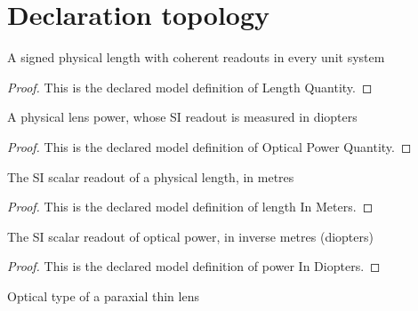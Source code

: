 \section{Declaration topology}
\begin{definition}
  \label{def:physics:phyx-mini-0130:phyxminiproblems-problemphyxmini0130-lengthquantity}
  A signed physical length with coherent readouts in every unit system
\end{definition}
\begin{proof}
  This is the declared model definition of Length Quantity.
\end{proof}
\begin{definition}
  \label{def:physics:phyx-mini-0130:phyxminiproblems-problemphyxmini0130-opticalpowerquantity}
  A physical lens power, whose SI readout is measured in diopters
\end{definition}
\begin{proof}
  This is the declared model definition of Optical Power Quantity.
\end{proof}
\begin{definition}
  \label{def:physics:phyx-mini-0130:phyxminiproblems-problemphyxmini0130-lengthinmeters}
  The SI scalar readout of a physical length, in metres
\end{definition}
\begin{proof}
  This is the declared model definition of length In Meters.
\end{proof}
\begin{definition}
  \label{def:physics:phyx-mini-0130:phyxminiproblems-problemphyxmini0130-powerindiopters}
  The SI scalar readout of optical power, in inverse metres (diopters)
\end{definition}
\begin{proof}
  This is the declared model definition of power In Diopters.
\end{proof}
\begin{definition}
  \label{def:physics:phyx-mini-0130:phyxminiproblems-problemphyxmini0130-thinlenskind}
  Optical type of a paraxial thin lens
\end{definition}

